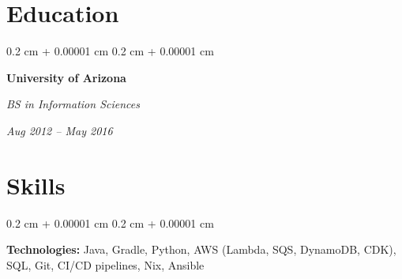 \documentclass[10pt, letterpaper]{article}
\newenvironment{onecolentry}{
    \begin{adjustwidth}{
        0.2 cm + 0.00001 cm
    }{
        0.2 cm + 0.00001 cm
    }
}{
    \end{adjustwidth}
} %
\newenvironment{twocolentry}[2][]{
    \onecolentry
    \def\secondColumn{#2}
    \setcolumnwidth{\fill, 4.5 cm}
    \begin{paracol}{2}
}{
    \switchcolumn \raggedleft \secondColumn
    \end{paracol}
    \endonecolentry
} %
\begin{document}
    
    \section{Education}



        
        \begin{twocolentry}{
            
            
        \textit{Aug 2012 – May 2016}}
            \textbf{University of Arizona}

            \textit{BS in Information Sciences}
        \end{twocolentry}




    
    \section{Skills}



        
        \begin{onecolentry}
            \textbf{Technologies:} Java, Gradle, Python, AWS (Lambda, SQS, DynamoDB, CDK), SQL, Git, CI/CD pipelines, Nix, Ansible
        \end{onecolentry}


    
\end{document}

